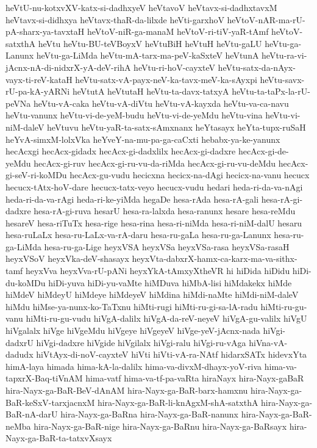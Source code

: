 {heVtU-nu-kotxvXV-katx-si-dadhxyeV
heVtavoV
heVtavx-si-dadhxtavxM
heVtavx-si-didhxya
heVtavx-thaR-da-lilxde
heVti-garxhoV
heVtoV-nAR-ma-rU-pA-sharx-ya-tavxtaH
heVtoV-niR-ga-manaM
heVtoV-ri-tiV-yaR-tAmf
heVtoV-satxthA
heVtu
heVtu-BU-teVBoyxV
heVtuBiH
heVtuH
heVtu-gaLU
heVtu-ga-Lanunx
heVtu-ga-LiMda
heVtu-mA-tarx-ma-peV-kaSxteV
heVtunA
heVtu-ra-vi-jAcnx-nA-di-nidxrX-yA-deV-rihA
heVtu-ri-hoV-cayxteV
heVtu-satx-da-nAyx-vayx-ti-reV-kataH
heVtu-satx-vA-payx-neV-ka-tavx-meV-ka-sAyxpi
heVtu-savx-rU-pa-kA-yARNi
heVtutA
heVtutaH
heVtu-ta-davx-tatxyA
heVtu-ta-taPx-la-rU-peVNa
heVtu-vA-caka
heVtu-vA-diVtu
heVtu-vA-kayxda
heVtu-va-ca-navu
heVtu-vanunx
heVtu-vi-de-yeM-budu
heVtu-vi-de-yeMdu
heVtu-vina
heVtu-vi-niM-daleV
heVtuvu
heVtu-yaR-ta-satx-sAmxnanx
heYtasayx
heYta-tupx-ruSaH
heYvA-simxM-lolxVka
heYveY-na-mu-pa-ga-caCxti
hebabx-ya-ke-yanunx
hecAcxgi
hecAcx-gidadx
hecAcx-gi-dadxlilx
hecAcx-gi-dadxre
hecAcx-gi-de-yeMdu
hecAcx-gi-ruv
hecAcx-gi-ru-vu-da-riMda
hecAcx-gi-ru-vu-deMdu
hecAcx-gi-seV-ri-koMDu
hecAcx-gu-vudu
hecicxna
hecicx-na-dAgi
hecicx-na-vanu
hecucx
hecucx-tAtx-hoV-dare
hecucx-tatx-veyo
hecucx-vudu
hedari
heda-ri-da-va-nAgi
heda-ri-da-va-rAgi
heda-ri-ke-yiMda
hegaDe
hesa-rAda
hesa-rA-gali
hesa-rA-gi-dadxre
hesa-rA-gi-ruva
hesarU
hesa-ra-lalxda
hesa-ranunx
hesare
hesa-reMdu
hesareV
hesa-riTuTx
hesa-rige
hesa-rina
hesa-ri-niMda
hesa-ri-niM-dalU
hesaru
hesa-ruLaLx
hesa-ru-LaLx-va-rA-daru
hesa-ru-gaLa
hesa-ru-ga-Lanunx
hesa-ru-ga-LiMda
hesa-ru-ga-Lige
heyxVSA
heyxVSa
heyxVSa-rasa
heyxVSa-rasaH
heyxVSoV
heyxVka-deV-shasayx
heyxVta-dabxrX-hamx-ca-karx-ma-va-sithx-tamf
heyxVva
heyxVva-rU-pANi
heyxYkA-tAmxyXtheVR
hi
hiDida
hiDidu
hiDi-du-koMDu
hiDi-yuva
hiDi-yu-vaMte
hiMDuva
hiMbA-lisi
hiMdakekx
hiMde
hiMdeV
hiMdeyU
hiMdeye
hiMdeyeV
hiMdina
hiMdi-naMte
hiMdi-niM-daleV
hiMdu
hiMse-ya-nunx-ko-TaTxnu
hiMti-rugi
hiMti-ru-gi-sa-lA-radu
hiMti-ru-gu-vanu
hiMti-ru-gu-vudu
hiVgA-dalilx
hiVgA-da-reV-neyeV
hiVgA-gu-valilx
hiVgU
hiVgalalx
hiVge
hiVgeMdu
hiVgeye
hiVgeyeV
hiVge-yeV-jAcnx-nada
hiVgi-dadxrU
hiVgi-dadxre
hiVgide
hiVgilalx
hiVgi-ralu
hiVgi-ru-vAga
hiVna-vA-dadudx
hiVtAyx-di-noV-cayxteV
hiVti
hiVti-vA-ra-NAtf
hidarxSATx
hidevxYta
himA-laya
himada
hima-kA-la-dalilx
hima-va-divxM-dhayx-yoV-riva
hima-va-tapxrX-Baq-tiVnAM
hima-vatf
hima-va-tf-pa-vaRta
hiraNayx
hira-Nayx-gaBaR
hira-Nayx-ga-BaR-BeV-dAnAM
hira-Nayx-ga-BaR-barx-hamxnu
hira-Nayx-ga-BaR-keSxV-tarxjacnxM
hira-Nayx-ga-BaR-li-knAgxM-shA-satxthA
hira-Nayx-ga-BaR-nA-darU
hira-Nayx-ga-BaRna
hira-Nayx-ga-BaR-nanunx
hira-Nayx-ga-BaR-neMba
hira-Nayx-ga-BaR-nige
hira-Nayx-ga-BaRnu
hira-Nayx-ga-BaRsayx
hira-Nayx-ga-BaR-ta-tatxvXsayx
}
